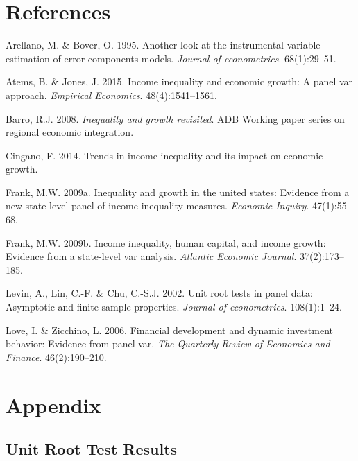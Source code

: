 \documentclass[11pt,preprint, authoryear]{elsarticle}
\numberwithin{equation}{section}
\numberwithin{figure}{section}
\numberwithin{table}{section}
\begin{document}
\newpage

\hypertarget{references}{%
\section*{References}\label{references}}

\hypertarget{refs}{}
\leavevmode\hypertarget{ref-arellano}{}%
Arellano, M. \& Bover, O. 1995. Another look at the instrumental
variable estimation of error-components models. \emph{Journal of
econometrics}. 68(1):29--51.

\leavevmode\hypertarget{ref-atems}{}%
Atems, B. \& Jones, J. 2015. Income inequality and economic growth: A
panel var approach. \emph{Empirical Economics}. 48(4):1541--1561.

\leavevmode\hypertarget{ref-barro}{}%
Barro, R.J. 2008. \emph{Inequality and growth revisited}. ADB Working
paper series on regional economic integration.

\leavevmode\hypertarget{ref-cingano}{}%
Cingano, F. 2014. Trends in income inequality and its impact on economic
growth.

\leavevmode\hypertarget{ref-frank}{}%
Frank, M.W. 2009a. Inequality and growth in the united states: Evidence
from a new state-level panel of income inequality measures.
\emph{Economic Inquiry}. 47(1):55--68.

\leavevmode\hypertarget{ref-frankincome}{}%
Frank, M.W. 2009b. Income inequality, human capital, and income growth:
Evidence from a state-level var analysis. \emph{Atlantic Economic
Journal}. 37(2):173--185.

\leavevmode\hypertarget{ref-levin}{}%
Levin, A., Lin, C.-F. \& Chu, C.-S.J. 2002. Unit root tests in panel
data: Asymptotic and finite-sample properties. \emph{Journal of
econometrics}. 108(1):1--24.

\leavevmode\hypertarget{ref-love}{}%
Love, I. \& Zicchino, L. 2006. Financial development and dynamic
investment behavior: Evidence from panel var. \emph{The Quarterly Review
of Economics and Finance}. 46(2):190--210.

\newpage

\hypertarget{appendix}{%
\section*{Appendix}\label{appendix}}

\hypertarget{unit-root-test-results}{%
\subsection{\texorpdfstring{Unit Root Test Results
\label{A}}{Unit Root Test Results }}\label{unit-root-test-results}}
\end{document}
